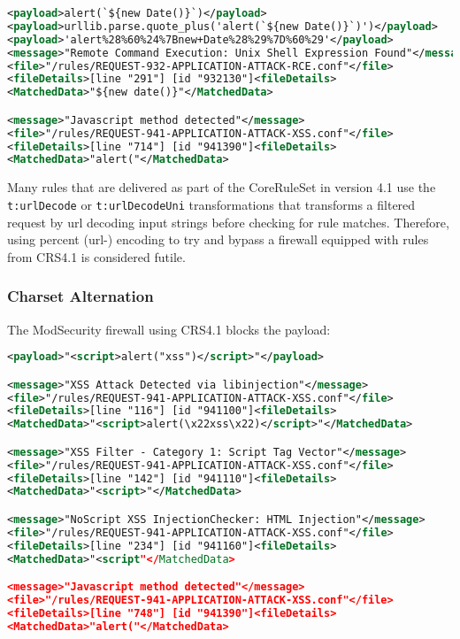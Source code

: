 \begin{lstlisting}[style=ruleStyle, language=XML, caption=url encoded example blocked, label={lst:urlencodedexampleblocked}]
<payload>alert(`${new Date()}`)</payload>
<payload>urllib.parse.quote_plus('alert(`${new Date()}`)')</payload>
<payload>'alert%28%60%24%7Bnew+Date%28%29%7D%60%29'</payload>
<message>"Remote Command Execution: Unix Shell Expression Found"</message>
<file>"/rules/REQUEST-932-APPLICATION-ATTACK-RCE.conf"</file>
<fileDetails>[line "291"] [id "932130"]<fileDetails>
<MatchedData>"${new date()}"</MatchedData>

<message>"Javascript method detected"</message>
<file>"/rules/REQUEST-941-APPLICATION-ATTACK-XSS.conf"</file>
<fileDetails>[line "714"] [id "941390"]<fileDetails>
<MatchedData>"alert("</MatchedData>
\end{lstlisting}

Many rules that are delivered as part of the CoreRuleSet in version 4.1 use the \verb|t:urlDecode| or \verb|t:urlDecodeUni| transformations that transforms a filtered request by url decoding input strings before checking for rule matches. Therefore, using percent (url-) encoding to try and bypass a firewall equipped with rules from CRS4.1 is considered futile.

\subsubsection{Charset Alternation}
\label{sec:charaltsingleiter}
The ModSecurity firewall using CRS4.1 blocks the payload:

\begin{lstlisting}[style=ruleStyle, language=XML, caption=charset alternation example blocked, label={lst:charsetaltexampleblocked}]
<payload>"<script>alert("xss")</script>"</payload>

<message>"XSS Attack Detected via libinjection"</message>
<file>"/rules/REQUEST-941-APPLICATION-ATTACK-XSS.conf"</file>
<fileDetails>[line "116"] [id "941100"]<fileDetails>
<MatchedData>"<script>alert(\x22xss\x22)</script>"</MatchedData>

<message>"XSS Filter - Category 1: Script Tag Vector"</message>
<file>"/rules/REQUEST-941-APPLICATION-ATTACK-XSS.conf"</file>
<fileDetails>[line "142"] [id "941110"]<fileDetails>
<MatchedData>"<script>"</MatchedData>

<message>"NoScript XSS InjectionChecker: HTML Injection"</message>
<file>"/rules/REQUEST-941-APPLICATION-ATTACK-XSS.conf"</file>
<fileDetails>[line "234"] [id "941160"]<fileDetails>
<MatchedData>"<script"</MatchedData>

<message>"Javascript method detected"</message>
<file>"/rules/REQUEST-941-APPLICATION-ATTACK-XSS.conf"</file>
<fileDetails>[line "748"] [id "941390"]<fileDetails>
<MatchedData>"alert("</MatchedData>
\end{lstlisting}

